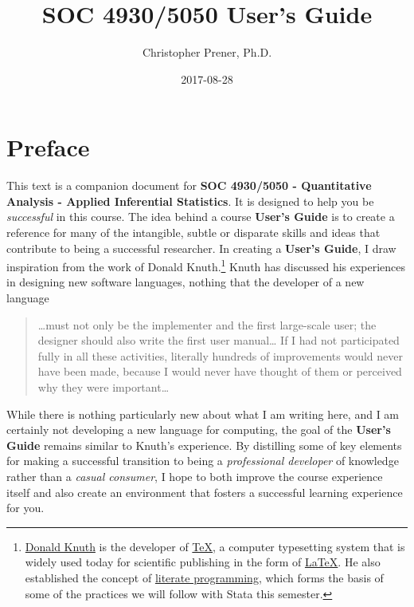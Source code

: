 \documentclass[]{book}
\title{SOC 4930/5050 User's Guide}
\author{Christopher Prener, Ph.D.}
\date{2017-08-28}
\let\rmarkdownfootnote\footnote%
\def\footnote{\protect\rmarkdownfootnote}
\theoremstyle{definition}
\theoremstyle{definition}
\theoremstyle{remark}
\begin{document}
\maketitle

{
\setcounter{tocdepth}{1}
\tableofcontents
}
\chapter*{Preface}\label{preface}

This text is a companion document for \textbf{SOC 4930/5050 -
Quantitative Analysis - Applied Inferential Statistics}. It is designed
to help you be \emph{successful} in this course. The idea behind a
course \textbf{User's Guide} is to create a reference for many of the
intangible, subtle or disparate skills and ideas that contribute to
being a successful researcher. In creating a \textbf{User's Guide}, I
draw inspiration from the work of Donald Knuth.\footnote{\href{https://en.wikipedia.org/wiki/Donald_Knuth}{Donald
  Knuth} is the developer of
  \href{https://en.wikipedia.org/wiki/TeX}{TeX}, a computer typesetting
  system that is widely used today for scientific publishing in the form
  of \href{https://en.wikipedia.org/wiki/LaTeX}{LaTeX}. He also
  established the concept of
  \href{https://en.wikipedia.org/wiki/Literate_programming}{literate
  programming}, which forms the basis of some of the practices we will
  follow with Stata this semester.} Knuth has discussed his experiences
in designing new software languages, nothing that the developer of a new
language

\begin{quote}
\ldots{}must not only be the implementer and the first large-scale user;
the designer should also write the first user manual\ldots{} If I had
not participated fully in all these activities, literally hundreds of
improvements would never have been made, because I would never have
thought of them or perceived why they were important\ldots{}
\end{quote}

While there is nothing particularly new about what I am writing here,
and I am certainly not developing a new language for computing, the goal
of the \textbf{User's Guide} remains similar to Knuth's experience. By
distilling some of key elements for making a successful transition to
being a \emph{professional developer} of knowledge rather than a
\emph{casual consumer}, I hope to both improve the course experience
itself and also create an environment that fosters a successful learning
experience for you.
\end{document}

